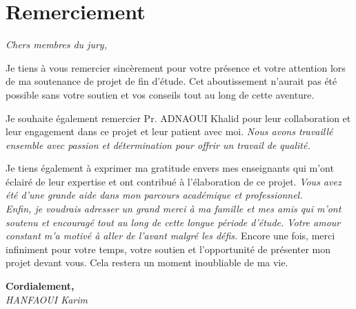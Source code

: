 \documentclass[a4paper,12pt]{report}
\newcommand{\frontmatter}{  
    \pagenumbering{arabic}  
      \setcounter{page}{1}  
}
\newcommand{\mainmatter}{  
    \pagenumbering{arabic}  
    \setcounter{page}{1}  
}
\begin{document}
\sloppy



\frontmatter    
\tableofcontents
\listoftables
\listoffigures

\mainmatter    

\chapter{Remerciement}

\begin{center}
  \textit{Chers membres du jury,}
\end{center}

\vspace{0.5cm}

\onehalfspacing
Je tiens à vous remercier sincèrement pour votre présence et votre attention lors de ma soutenance de projet de fin d’étude. Cet aboutissement n’aurait pas été possible sans votre soutien et vos conseils tout au long de cette aventure.

\vspace{0.3cm}
Je souhaite également remercier Pr. ADNAOUI Khalid pour leur collaboration et leur engagement dans ce projet et leur patient avec moi. \textit{Nous avons travaillé ensemble avec passion et détermination pour offrir un travail de qualité.}
\vspace{0.3cm}

Je tiens également à exprimer ma gratitude envers mes enseignants qui m’ont éclairé de leur expertise et ont contribué à l’élaboration de ce projet. \textit{Vous avez été d’une grande aide dans mon parcours académique et professionnel.}
\vspace{0.3cm} \\
\textit{Enfin, je voudrais adresser un grand merci à ma famille et mes amis qui m’ont soutenu et encouragé tout au long de cette longue période d’étude. Votre amour constant m’a motivé à aller de l’avant malgré les défis.}
\vspace{0.3cm}
Encore une fois, merci infiniment pour votre temps, votre soutien et l’opportunité de présenter mon projet devant vous. Cela restera un moment inoubliable de ma vie.
\vspace{0.5cm}

\begin{flushright}
  \textbf{Cordialement,} \\
  \vspace{0.2cm}
  \textit{HANFAOUI Karim}
\end{flushright}
\end{document}
